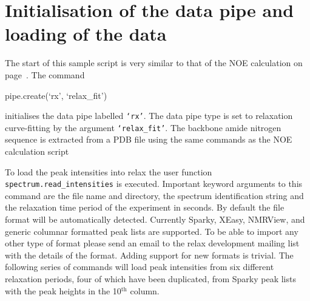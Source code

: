 
\section{Initialisation of the data pipe and loading of the data}

The start of this sample script is very similar to that of the NOE calculation on page~\pageref{NOE initialisation}.  The command

\begin{exampleenv}
pipe.create(`rx', `relax\_fit')
\end{exampleenv}

initialises the data pipe labelled \texttt{`rx'}.  The data pipe type is set to relaxation curve-fitting by the argument \texttt{`relax\_fit'}.  The backbone amide nitrogen sequence is extracted from a PDB file using the same commands as the NOE calculation script



To load the peak intensities into relax the user function \texttt{spectrum.read\_intensities} is executed.  Important keyword arguments to this command are the file name and directory, the spectrum identification string and the relaxation time period of the experiment in seconds.  By default the file format will be automatically detected.  Currently Sparky, XEasy, NMRView, and generic columnar formatted peak lists are supported.  To be able to import any other type of format please send an email to the relax development mailing list with the details of the format.  Adding support for new formats is trivial.  The following series of commands will load peak intensities from six different relaxation periods, four of which have been duplicated, from Sparky peak lists with the peak heights in the 10$^\textrm{th}$ column.

